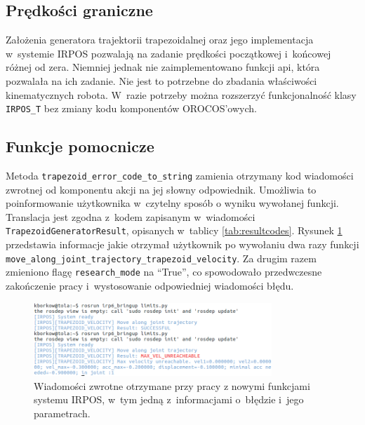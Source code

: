 \documentclass[a4paper, 12pt]{article}
\begin{document}
	\subsection{Prędkości graniczne}
	\label{sec:borderVels}
	Założenia generatora trajektorii trapezoidalnej oraz jego implementacja w~systemie IRPOS pozwalają na zadanie prędkości początkowej i~końcowej różnej od zera. Niemniej jednak nie zaimplementowano funkcji api, która pozwalała na ich zadanie. Nie jest to potrzebne do zbadania właściwości kinematycznych robota. W~razie potrzeby można rozszerzyć funkcjonalność klasy \texttt{IRPOS\_T} bez zmiany kodu komponentów OROCOS'owych.
	
	\subsection{Funkcje pomocnicze}
	\label{sec:auxilary}
	Metoda \texttt{trapezoid\_error\_code\_to\_string} zamienia otrzymany kod wiadomości zwrotnej od komponentu akcji na jej słowny odpowiednik. Umożliwia to poinformowanie użytkownika w~czytelny sposób o wyniku wywołanej funkcji.
	Translacja jest zgodna z~kodem zapisanym w~wiadomości \texttt{TrapezoidGeneratorResult}, opisanych w~tablicy \ref{tab:resultcodes}. Rysunek \ref{fig:msg_eg} przedstawia informacje jakie otrzymał użytkownik po wywołaniu dwa razy funkcji 
	\linebreakig
	\texttt{move\_along\_joint\_trajectory\_trapezoid\_velocity}. Za drugim razem zmieniono flagę \linebreak \texttt{research\_mode} na \textquotedblleft True\textquotedblright, co spowodowało przedwczesne zakończenie pracy i~wystosowanie odpowiedniej wiadomości błędu.
	\begin{figure}[t]
	\centering
	\includegraphics[width=0.8\textwidth]{raport_pics/msgs_from_gen.png}
	\caption{Wiadomości zwrotne otrzymane przy pracy z nowymi funkcjami systemu IRPOS, w~tym jedną z~informacjami o~błędzie i~jego parametrach.}
	\label{fig:msg_eg}
	\end{figure}
	
\end{document}

